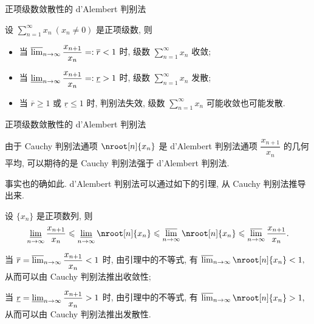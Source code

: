 \begin{frame}{正项级数敛散性的 d'Alembert 判别法}

\begin{thm}
设 $\sum\limits_{n=1}^\infty x_n ~ (x_n \neq 0)$ 是正项级数, 则
\begin{itemize}
\item[(1).] 当 $\varlimsup_{n\to\infty} \dfrac{x_{n+1}}{x_n} =: \overline{r} < 1$ 时, 级数 $\sum\limits_{n=1}^\infty x_n$ 收敛;
\item[(2).] 当 $\varliminf_{n\to\infty} \dfrac{x_{n+1}}{x_n} =: \underline{r} > 1$ 时, 级数 $\sum\limits_{n=1}^\infty x_n$ 发散;
\item[(3).] 当 $\overline{r} \geqslant 1$ 或 $\underline{r} \leqslant 1$ 时, 判别法失效, 级数 $\sum\limits_{n=1}^\infty x_n$ 可能收敛也可能发散.
\end{itemize}
\end{thm}

\end{frame}


\begin{frame}{正项级数敛散性的 d'Alembert 判别法}

由于 Cauchy 判别法通项 $\nroot[n]{x_n}$ 是 d'Alembert 判别法通项 $\dfrac{x_{n+1}}{x_n}$ 的几何平均, 可以期待的是 Cauchy 判别法强于 d'Alembert 判别法.

\pause
\vspace*{0.4em}

事实也的确如此. d'Alembert 判别法可以通过如下的引理, 从 Cauchy 判别法推导出来.

\pause
\vspace*{0.4em}

\begin{lem}
设 $\{x_n\}$ 是正项数列, 则
\[\varliminf_{n\to\infty} \dfrac{x_{n+1}}{x_n} \leqslant \varliminf_{n\to\infty} \nroot[n]{x_n} \leqslant \varlimsup_{n\to\infty} \nroot[n]{x_n} \leqslant \varlimsup_{n\to\infty} \dfrac{x_{n+1}}{x_n}.\]
\end{lem}

\pause
\vspace*{0.6em}

当 $\overline{r} = \varlimsup_{n\to\infty} \dfrac{x_{n+1}}{x_n} < 1$ 时, 由引理中的不等式, 有 $\varlimsup_{n\to\infty} \nroot[n]{x_n} < 1,$ 从而可以由 Cauchy 判别法推出收敛性;

\pause
\vspace*{0.6em}
当 $\underline{r} = \varliminf_{n\to\infty} \dfrac{x_{n+1}}{x_n} > 1$ 时, 由引理中的不等式, 有 $\varlimsup_{n\to\infty} \nroot[n]{x_n} > 1,$ 从而可以由 Cauchy 判别法推出发散性.

\end{frame}

